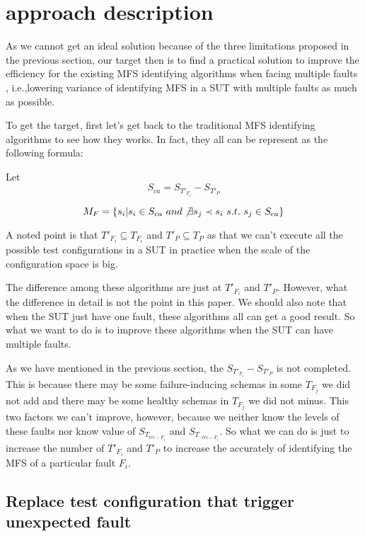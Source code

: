 \documentclass{sig-alternate}
\begin{document}
\section{approach description}

As we cannot get an ideal solution because of the three limitations proposed in the previous section, our target then is to find a practical solution to improve the efficiency for the existing MFS identifying algorithms when facing multiple faults , i.e.,lowering variance of identifying  MFS in a SUT with multiple faults as much as possible.

To get the target, first let's get back to the traditional MFS identifying algorithms to see how they works. In fact, they all can be represent as the following formula:

Let $$S_{ca} = S_{T'_{F_{i}}} - S_{T'_{P}}$$

$$M_{F} = \{s_{i} | s_{i} \in S_{ca}\ and \not\exists s_{j} \prec s_{i}\ s.t.\ s_{j} \in S_{ca} \}$$

A noted point is that  $ T'_{F_{i}} \subseteq T_{F_{i}} $ and $ T'_{P} \subseteq T_{P} $ as that we can't execute all the possible test configurations in a SUT in practice when the scale of the configuration space is big.

The difference among these algorithms are just at $T'_{F_{i}}$ and  $T'_{P}$. However, what the difference in detail is not the point in this paper. We should also note that when the SUT just have one fault, these algorithms all can get a good result. So what we want to do is to improve these algorithms when the SUT can have multiple faults.

As we have mentioned in the previous section, the $S_{T'_{F_{i}}} - S_{T'_{P}}$ is not completed. This is because there may be some failure-inducing schemas in some $T_{F_{j}}$ we did not add and there may be some healthy schemas in $T_{F_{j}}$ we did not minus. This two factors we can't improve, however, because we neither know the levels of these faults nor know value of $S_{T_{tri-F_{i}}}$ and  $S_{T_{\neg tri-F_{i}}}$. So what we can do is just to increase the number of $T'_{F_{i}}$ and $T'_{P}$ to increase the accurately of identifying the MFS of a particular fault $F_{i}$.

\subsection{Replace test configuration that trigger unexpected fault}
\end{document}
